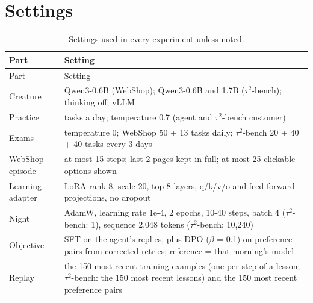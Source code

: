 \section{Settings}\label{app:protocol}

\begin{longtable}[]{@{}
  >{\raggedright\arraybackslash}p{}
  >{\raggedright\arraybackslash}p{}@{}}
\caption{Settings used in every experiment unless noted.}\label{tab:A1}\tabularnewline
\toprule\noalign{}
\begin{minipage}[b]{\linewidth}\raggedright
Part
\end{minipage} & \begin{minipage}[b]{\linewidth}\raggedright
Setting
\end{minipage} \\
\midrule\noalign{}
\endfirsthead
\toprule\noalign{}
\begin{minipage}[b]{\linewidth}\raggedright
Part
\end{minipage} & \begin{minipage}[b]{\linewidth}\raggedright
Setting
\end{minipage} \\
\midrule\noalign{}
\endhead
\bottomrule\noalign{}
\endlastfoot
Creature & Qwen3-0.6B (WebShop); Qwen3-0.6B and 1.7B ($\tau^2$-bench); thinking off; vLLM \\
Practice & 30 tasks a day; temperature 0.7 (agent and $\tau^2$-bench customer) \\
Exams & temperature 0; WebShop 50 + 13 tasks daily; $\tau^2$-bench 20 + 40 + 40 tasks every 3 days \\
WebShop episode & at most 15 steps; last 2 pages kept in full; at most 25 clickable options shown \\
Learning adapter & LoRA rank 8, scale 20, top 8 layers, q/k/v/o and feed-forward projections, no dropout \\
Night & AdamW, learning rate 1e-4, 2 epochs, 10-40 steps, batch 4 ($\tau^2$-bench: 1), sequence 2,048 tokens ($\tau^2$-bench: 10,240) \\
Objective & SFT on the agent's replies, plus DPO ($\beta$ = 0.1) on preference pairs from corrected retries; reference = that morning's model \\
Replay & the 150 most recent training examples (one per step of a lesson; $\tau^2$-bench: the 150 most recent lessons) and the 150 most recent preference pairs \\

\end{longtable}
